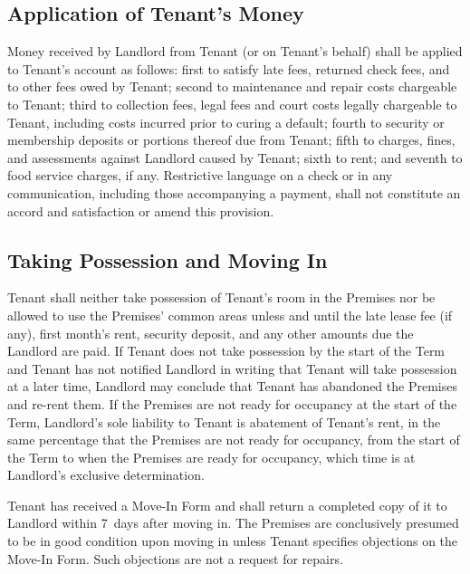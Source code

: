 \documentclass{article}
\begin{document}
\subsection{Application of Tenant’s Money}
Money received by Landlord from Tenant (or on Tenant’s behalf) shall be applied
to Tenant’s account as follows: first to satisfy late fees, returned check fees,
and to other fees owed by Tenant; second to maintenance and repair costs
chargeable to Tenant; third to collection fees, legal fees and court costs
legally chargeable to Tenant, including costs incurred prior to curing a
default; fourth to security or membership deposits or portions thereof due from
Tenant; fifth to charges, fines, and assessments against Landlord caused by
Tenant; sixth to rent; and seventh to food service charges, if any. Restrictive
language on a check or in any communication, including those accompanying a
payment, shall not constitute an accord and satisfaction or amend this
provision.

\subsection{Taking Possession and Moving In}
Tenant shall neither take possession of Tenant’s room in the Premises nor be
allowed to use the Premises’ common areas unless and until the late lease fee
(if any), first month’s rent, security deposit, and any other amounts due the
Landlord are paid. If Tenant does not take possession by the start of the Term
and Tenant has not notified Landlord in writing that Tenant will take possession
at a later time, Landlord may conclude that Tenant has abandoned the Premises
and re-rent them. If the Premises are not ready for occupancy at the start of
the Term, Landlord’s sole liability to Tenant is abatement of Tenant’s rent, in
the same percentage that the Premises are not ready for occupancy, from the
start of the Term to when the Premises are ready for occupancy, which time is at
Landlord’s exclusive determination.

Tenant has received a Move-In Form and shall return a completed copy of it to
Landlord within 7~days after moving in. The Premises are conclusively presumed
to be in good condition upon moving in unless Tenant specifies objections on the
Move-In Form. Such objections are not a request for repairs.
\end{document}
